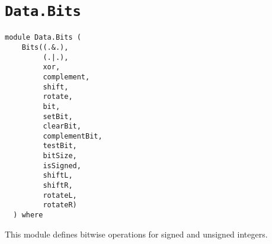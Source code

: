 \chapter{\texttt{Data.Bits}}
\label{module:Data.Bits}
\haddockbeginheader
{\haddockverb\begin{verbatim}
module Data.Bits (
    Bits((.&.),
         (.|.),
         xor,
         complement,
         shift,
         rotate,
         bit,
         setBit,
         clearBit,
         complementBit,
         testBit,
         bitSize,
         isSigned,
         shiftL,
         shiftR,
         rotateL,
         rotateR)
  ) where\end{verbatim}}
\haddockendheader

This module defines bitwise operations for signed and unsigned
 integers.
\par

